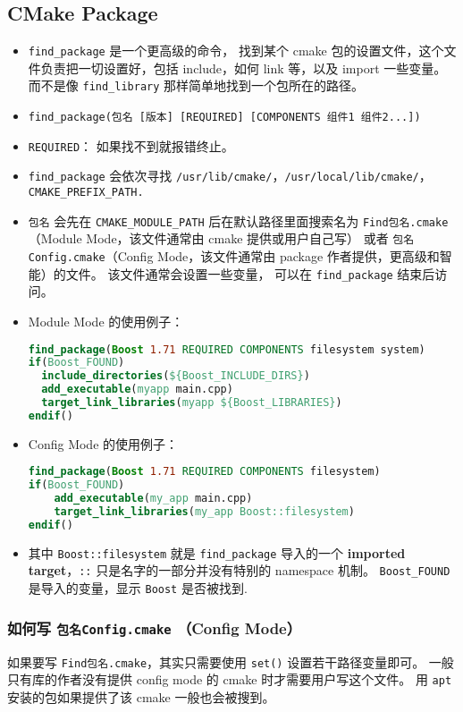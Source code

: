 \subsection{CMake Package}
\begin{itemize}
\item \verb`find_package` 是一个更高级的命令， 找到某个 cmake 包的设置文件，这个文件负责把一切设置好，包括 include，如何 link 等，以及 import 一些变量。 而不是像 \verb`find_library` 那样简单地找到一个包所在的路径。
\item \verb`find_package(包名 [版本] [REQUIRED] [COMPONENTS 组件1 组件2...])`
\item \verb`REQUIRED`： 如果找不到就报错终止。
\item \verb`find_package` 会依次寻找 \verb`/usr/lib/cmake/`，\verb`/usr/local/lib/cmake/`，\verb`CMAKE_PREFIX_PATH.`
\item \verb`包名` 会先在 \verb`CMAKE_MODULE_PATH` 后在默认路径里面搜索名为 \verb`Find包名.cmake`（Module Mode，该文件通常由 cmake 提供或用户自己写） 或者 \verb`包名Config.cmake`（Config Mode，该文件通常由 package 作者提供，更高级和智能）的文件。 该文件通常会设置一些变量， 可以在 \verb`find_package` 结束后访问。
\item Module Mode 的使用例子：
\begin{lstlisting}[language=cmake]
find_package(Boost 1.71 REQUIRED COMPONENTS filesystem system)
if(Boost_FOUND)
  include_directories(${Boost_INCLUDE_DIRS})
  add_executable(myapp main.cpp)
  target_link_libraries(myapp ${Boost_LIBRARIES})
endif()
\end{lstlisting}
\item Config Mode 的使用例子：
\begin{lstlisting}[language=cmake]
find_package(Boost 1.71 REQUIRED COMPONENTS filesystem)
if(Boost_FOUND)
    add_executable(my_app main.cpp)
    target_link_libraries(my_app Boost::filesystem)
endif()
\end{lstlisting}
\item 其中 \verb`Boost::filesystem` 就是 \verb`find_package` 导入的一个 \textbf{imported target}，\verb`::` 只是名字的一部分并没有特别的 namespace 机制。 \verb`Boost_FOUND` 是导入的变量，显示 \verb`Boost` 是否被找到.
\end{itemize}

\subsubsection{如何写 \verb`包名Config.cmake` （Config Mode）}
如果要写 \verb`Find包名.cmake`，其实只需要使用 \verb`set()` 设置若干路径变量即可。 一般只有库的作者没有提供 config mode 的 cmake 时才需要用户写这个文件。 用 \verb`apt` 安装的包如果提供了该 cmake 一般也会被搜到。

